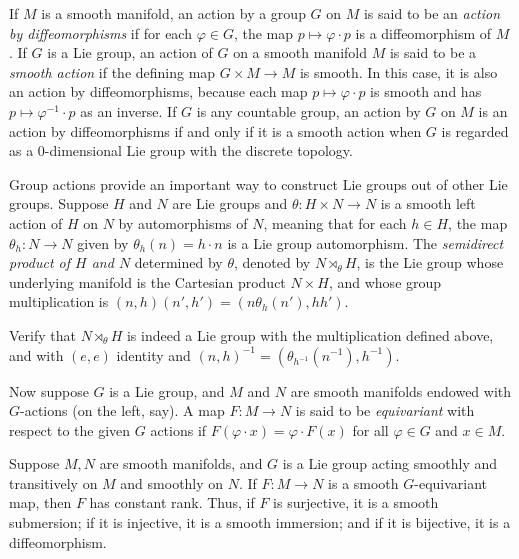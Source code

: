 If $M$ is a smooth manifold, an action by a group $G$ on $M$ is said to be an \textit{action by diffeomorphisms} if for each $\varphi \in G$, the map $p \mapsto \varphi \cdot p$ is a diffeomorphism of $M$. If $G$ is a Lie group, an action of $G$ on a smooth manifold $M$ is said to be a \textit{smooth action} if the defining map $G \times M \to M$ is smooth. In this case, it is also an action by diffeomorphisms, because each map $p \mapsto \varphi \cdot p$ is smooth and has $p \mapsto \varphi^{-1} \cdot p$ as an inverse. If $G$ is any countable group, an action by $G$ on $M$ is an action by diffeomorphisms if and only if it is a smooth action when $G$ is regarded as a $0$-dimensional Lie group with the discrete topology.

\begin{example}
\label{ex:semidirect-products}
Group actions provide an important way to construct Lie groups out of other Lie groups. Suppose $H$ and $N$ are Lie groups and $\theta : H \times N \to N$ is a smooth left action of $H$ on $N$ by automorphisms of $N$, meaning that for each $h \in H$, the map $\theta_h : N \to N$ given by $\theta_h(n) = h \cdot n$ is a Lie group automorphism. The \textit{semidirect product of $H$ and $N$} determined by $\theta$, denoted by $N \rtimes_\theta H$, is the Lie group whose underlying manifold is the Cartesian product $N \times H$, and whose group multiplication is $(n,h)(n',h') = (n\theta_h(n'),hh')$.
\end{example}

\begin{exercise}
\label{exer:semidirect-product-verification}
Verify that $N \rtimes_\theta H$ is indeed a Lie group with the multiplication defined above, and with $(e,e)$ identity and $(n,h)^{-1} = (\theta_{h^{-1}}(n^{-1}),h^{-1})$.
\end{exercise}

Now suppose $G$ is a Lie group, and $M$ and $N$ are smooth manifolds endowed with $G$-actions (on the left, say). A map $F : M \to N$ is said to be \textit{equivariant} with respect to the given $G$ actions if $F(\varphi \cdot x) = \varphi \cdot F(x)$ for all $\varphi \in G$ and $x \in M$.

\begin{theorem}
\label{thm:equivariant-rank-theorem}
Suppose $M, N$ are smooth manifolds, and $G$ is a Lie group acting smoothly and transitively on $M$ and smoothly on $N$. If $F : M \to N$ is a smooth $G$-equivariant map, then $F$ has constant rank. Thus, if $F$ is surjective, it is a smooth submersion; if it is injective, it is a smooth immersion; and if it is bijective, it is a diffeomorphism.
\end{theorem}


